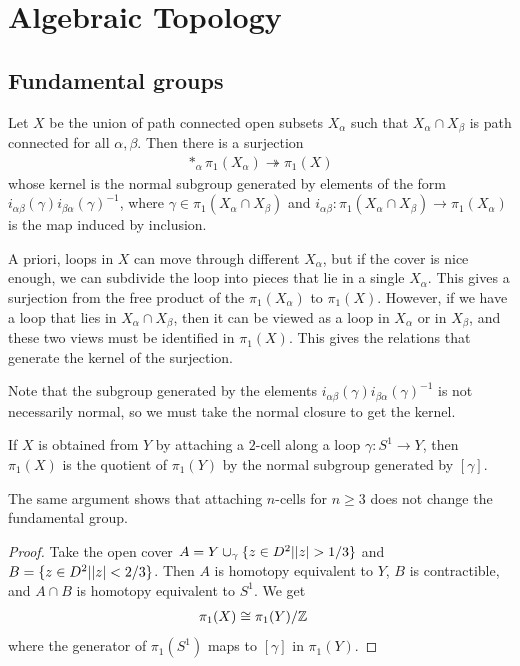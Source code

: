 \documentclass[12pt]{article}
\begin{document}
\section{Algebraic Topology}
\subsection{Fundamental groups}
\begin{theorem}
    Let $X$ be the union of path connected open subsets $X_\alpha$ such that $X_\alpha \cap X_\beta$ is path connected for all $\alpha,\beta$. Then there is a surjection \begin{align*}
        \ast_\alpha \pi_1(X_\alpha) \twoheadrightarrow \pi_1(X)
    \end{align*} whose kernel is the normal subgroup generated by elements of the form $i_{\alpha\beta}(\gamma)i_{\beta\alpha}(\gamma)^{-1}$, where $\gamma \in \pi_1(X_\alpha \cap X_\beta)$ and $i_{\alpha\beta} : \pi_1(X_\alpha \cap X_\beta) \to \pi_1(X_\alpha)$ is the map induced by inclusion.
\end{theorem}
A priori, loops in $X$ can move through different $X_\alpha$, but if the cover is nice enough, we can subdivide the loop into pieces that lie in a single $X_\alpha$. This gives a surjection from the free product of the $\pi_1(X_\alpha)$ to $\pi_1(X)$. However, if we have a loop that lies in $X_\alpha \cap X_\beta$, then it can be viewed as a loop in $X_\alpha$ or in $X_\beta$, and these two views must be identified in $\pi_1(X)$. This gives the relations that generate the kernel of the surjection.

Note that the subgroup generated by the elements $i_{\alpha\beta}(\gamma)i_{\beta\alpha}(\gamma)^{-1}$ is not necessarily normal, so we must take the normal closure to get the kernel.

\begin{corollary}
    If $X$ is obtained from $Y$ by attaching a $2$-cell along a loop $\gamma:S^1 \to Y$, then $\pi_1(X)$ is the quotient of $\pi_1(Y)$ by the normal subgroup generated by $[\gamma]$.
\end{corollary}
The same argument shows that attaching $n$-cells for $n \ge 3$ does not change the fundamental group.

\begin{proof}
    Take the open cover $A = Y \cup_\gamma \{z\in D^2 \vert |z| > 1/3\}$ and $B = \{z\in D^2 \vert |z| < 2/3\}$. Then $A$ is homotopy equivalent to $Y$, $B$ is contractible, and $A \cap B$ is homotopy equivalent to $S^1$. We get \begin{align*}
        \pi_1(X) & \cong \pi_1(Y)/\mathbb{Z}
    \end{align*} where the generator of $\pi_1(S^1)$ maps to $[\gamma]$ in $\pi_1(Y)$.
\end{proof}
\end{document}
